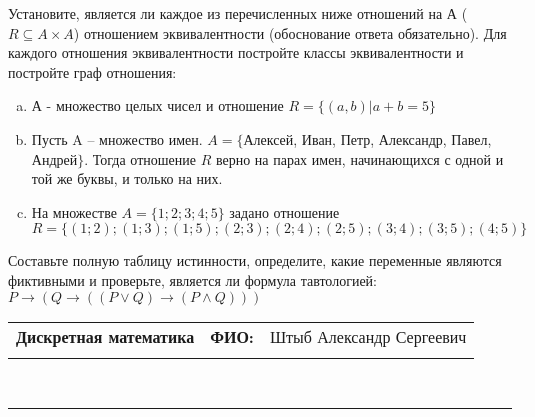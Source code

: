 \documentclass[10pt]{exam}
\newcommand{\class}{Дискретная математика}
\newcommand{\examdate}{}
\begin{document}
\begin{questions}
\question
Установите, является ли каждое из перечисленных ниже отношений на А ($R \subseteq A \times A$) отношением эквивалентности (обоснование ответа обязательно). Для каждого отношения эквивалентности постройте классы 
эквивалентности и постройте граф отношения:
\begin{enumerate} [a)]\setcounter{enumi}{0}
\item А - множество целых чисел и отношение $R = \{(a,b)|a + b = 5\}$
\item Пусть A – множество имен. $A = \{ $Алексей, Иван, Петр, Александр, Павел, Андрей$ \}$. Тогда отношение $R $ верно на парах имен, начинающихся с одной и той же буквы, и только на них.
\item На множестве $A = \{1; 2; 3; 4; 5\}$ задано отношение $R = \{(1; 2); (1; 3); (1; 5); (2; 3); (2; 4); (2; 5); (3; 4); (3; 5); (4; 5)\}$
\end{enumerate}\question Составьте полную таблицу истинности, определите, какие переменные являются фиктивными и проверьте, является ли формула тавтологией:
$ P \rightarrow (Q \rightarrow ((P \lor Q) \rightarrow (P \land Q)))$

\end{questions}
\newpage
\begin{flushright}
\begin{tabular}{p{2.8in} r l}
\textbf{\class} & \textbf{ФИО:} &Штыб Александр Сергеевич
\\

\textbf{\examdate} &&\\
\end{tabular}\\
\end{flushright}
\rule[1ex]{\textwidth}{.1pt}
\end{document}
